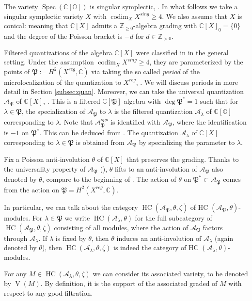 \documentclass[12pt]{amsart}
\newcommand{\C}{\mathbb{C}}
\newcommand{\A}{\mathcal{A}}
\newcommand{\Orb}{\mathbb{O}}
\newcommand{\Z}{\mathbb{Z}}
\newcommand{\HC}{\operatorname{HC}}
\newcommand{\param}{\mathfrak{P}}
\theoremstyle{definition}
\numberwithin{equation}{section}
\begin{document}
The variety $\operatorname{Spec}(\C[\Orb])$ is singular symplectic, \cite{Beauville}.
In what follows we take a singular symplectic variety $X$ with $\operatorname{codim}_X X^{sing}\geqslant 4$. We also assume that $X$ is conical: meaning that $\C[X]$ admits a $\Z_{\geqslant 0}$-algebra grading
with $\C[X]_0=\{0\}$ and the degree of the Poisson bracket is $-d$ for $d\in \Z_{>0}$.

Filtered quantizations of the algebra $\C[X]$ were classified in \cite[Theorem 3.4]{orbit}
in the general setting. Under the assumption $\operatorname{codim}_X X^{sing}\geqslant 4$, they are parameterized by the points of $\param:=H^2(X^{reg},\C)$ via taking the so called {\it period} of the microlocalization of
the quantization to $X^{reg}$, \cite[Corollary 3.2(1)]{orbit}. We will discuss periods in more detail in
Section \ref{subsec:quan}. Moreover, we can take the universal
quantization $\A_{\param}$ of $\C[X]$, \cite[Corollary 3.2(2)]{orbit}.
This is a filtered $\C[\param]$-algebra with
$\deg \param^*=1$ such that for $\lambda\in \param$, the specialization of $\A_{\param}$
to $\lambda$ is the filtered quantization $\A_\lambda$ of $\C[\Orb]$ corresponding to $\lambda$.
Note that $\A_{\param}^{opp}$ is identified with $\A_{\param}$, where the identification is
$-1$ on $\param^*$. This can be deduced from \cite[Proposition 3.2]{BPW}.
The quantization $\A_\lambda$ of $\C[X]$ corresponding to $\lambda\in \param$
is obtained from $\A_{\param}$ by specializing the parameter to $\lambda$.

Fix a Poisson anti-involution $\theta$ of
$\C[X]$ that preserves the grading. Thanks to the universality property
of $\A_{\param}$ (\cite[Proposition 3.5]{orbit}), $\theta$ lifts to an anti-involution
of $\A_{\param}$ also denoted by $\theta$, compare to the beginning of
\cite[Section 3.7]{orbit}. The action of $\theta$ on $\param^*\subset \A_\param$
comes from the action on $\param=H^2(X^{reg},\C)$.

In particular, we can talk about the category $\HC(\A_{\param},\theta,\zeta)$
of HC $(\A_{\param},\theta)$-modules. For $\lambda\in \param$ we write $\HC(\A_\lambda,\theta)$
for the full subcategory of $\HC(\A_{\param},\theta,\zeta)$ consisting of all modules, where
the action of $\A_{\param}$ factors through $\A_\lambda$. If $\lambda$ is fixed by $\theta$,
then $\theta$ induces an anti-involution of $\A_\lambda$ (again denoted by $\theta$), then
$\HC(\A_\lambda,\theta,\zeta)$ is indeed the category of HC $(\A_\lambda,\theta)$-modules.


For any $M\in \HC(\A_\lambda,\theta,\zeta)$ we can consider its associated variety, to be denoted
by $\operatorname{V}(M)$. By definition, it is the support of the associated graded of
$M$ with respect to any good filtration.
\end{document}
